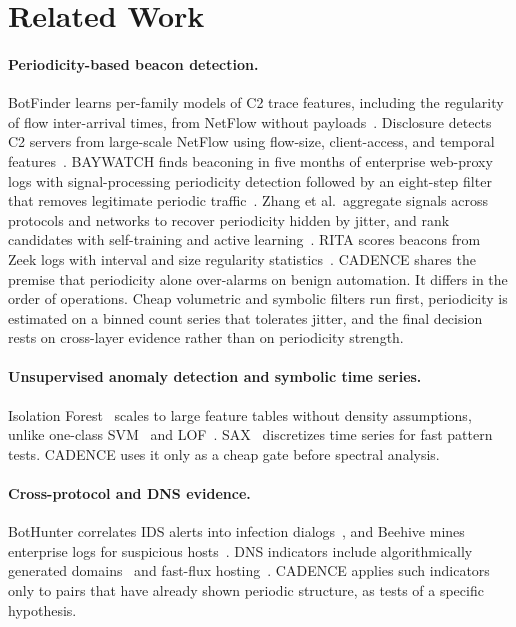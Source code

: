 \documentclass[runningheads]{llncs}
\begin{document}
\section{Related Work}

\paragraph{Periodicity-based beacon detection.}
BotFinder learns per-family models of C2 trace features, including the regularity of flow inter-arrival times, from NetFlow without payloads~\cite{tegeler2012botfinder}. Disclosure detects C2 servers from large-scale NetFlow using flow-size, client-access, and temporal features~\cite{bilge2012disclosure}. BAYWATCH finds beaconing in five months of enterprise web-proxy logs with signal-processing periodicity detection followed by an eight-step filter that removes legitimate periodic traffic~\cite{hu2016baywatch}. Zhang et al.\ aggregate signals across protocols and networks to recover periodicity hidden by jitter, and rank candidates with self-training and active learning~\cite{zhang2023aggregation}. RITA scores beacons from Zeek logs with interval and size regularity statistics~\cite{rita}. CADENCE shares the premise that periodicity alone over-alarms on benign automation. It differs in the order of operations. Cheap volumetric and symbolic filters run first, periodicity is estimated on a binned count series that tolerates jitter, and the final decision rests on cross-layer evidence rather than on periodicity strength.

\paragraph{Unsupervised anomaly detection and symbolic time series.}
Isolation Forest~\cite{liu2008iforest} scales to large feature tables without density assumptions, unlike one-class SVM~\cite{scholkopf2001ocsvm} and LOF~\cite{breunig2000lof}. SAX~\cite{lin2003sax} discretizes time series for fast pattern tests. CADENCE uses it only as a cheap gate before spectral analysis.

\paragraph{Cross-protocol and DNS evidence.}
BotHunter correlates IDS alerts into infection dialogs~\cite{gu2007bothunter}, and Beehive mines enterprise logs for suspicious hosts~\cite{yen2013beehive}. DNS indicators include algorithmically generated domains~\cite{yadav2010dga,antonakakis2012dga} and fast-flux hosting~\cite{holz2008fastflux}. CADENCE applies such indicators only to pairs that have already shown periodic structure, as tests of a specific hypothesis.
\end{document}
